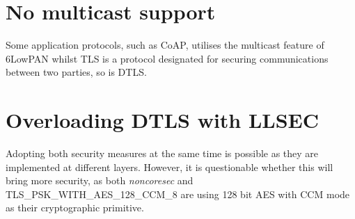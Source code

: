 \section{No multicast support}
Some application protocols, such as CoAP, utilises the multicast feature of 6LowPAN whilst TLS is a protocol designated for securing communications between two parties, so is DTLS.

\section{Overloading DTLS with LLSEC}
Adopting both security measures at the same time is possible as they are implemented at different layers. However, it is questionable whether this will bring more security, as both {\it noncoresec} and TLS\_PSK\_WITH\_AES\_128\_CCM\_8 are using 128 bit AES with CCM mode as their cryptographic primitive.
